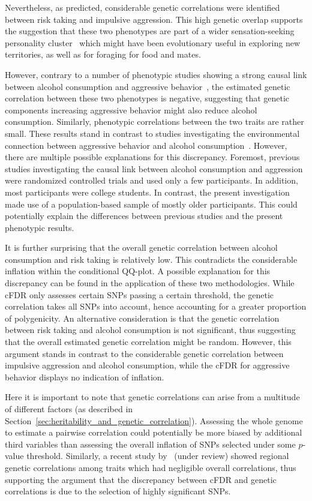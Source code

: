 Nevertheless, as predicted, considerable genetic correlations were identified between risk taking and impulsive aggression.
This high genetic overlap supports the suggestion that these two phenotypes are part of a wider sensation-seeking personality cluster~\cite{Zuckerman2000} which might have been evolutionary useful in exploring new territories, as well as for foraging for food and mates.

However, contrary to a number of phenotypic studies showing a strong causal link between alcohol consumption and aggressive behavior~\cite{FRANZKOWIAX1987,Zuckerman2000,Dakwar2011}, the estimated genetic correlation between these two phenotypes is negative, suggesting that genetic components increasing aggressive behavior might also reduce alcohol consumption.
Similarly, phenotypic correlations between the two traits are rather small.
These results stand in contrast to studies investigating the environmental connection between aggressive behavior and alcohol consumption~\cite{Bushman1990}.
However, there are multiple possible explanations for this discrepancy.
Foremost, previous studies investigating the causal link between alcohol consumption and aggression were randomized controlled trials and used only a few participants.
In addition, most participants were college students.
In contrast, the present investigation made use of a population-based sample of mostly older participants.
This could potentially explain the differences between previous studies and the  present phenotypic results.

It is further surprising that the overall genetic correlation between alcohol consumption and risk taking is relatively low.
This contradicts the considerable inflation within the conditional QQ-plot.
A possible explanation for this discrepancy can be found in the application of these two methodologies.
While cFDR only assesses certain SNPs passing a certain threshold, the genetic correlation takes all SNPs into account, hence accounting for a greater proportion of polygenicity.
An alternative consideration is that the genetic correlation between risk taking and alcohol consumption is not significant, thus suggesting that the overall estimated genetic correlation might be random.
However, this argument stands in contrast to the considerable genetic correlation between impulsive aggression and alcohol consumption, while the cFDR for aggressive behavior displays no indication of  inflation.

Here it is important to note that genetic correlations can arise from a multitude of different factors (as described in Section~\ref{sec:heritability_and_genetic_correlation}).
Assessing the whole genome to estimate a pairwise correlation could potentially be more biased by additional third variables than assessing the overall inflation of SNPs selected under some $p$-value threshold.
Similarly, a recent study by~\citet{Shi2016a} (under review) showed regional genetic correlations among traits which had negligible overall correlations,
thus supporting the argument that the discrepancy between cFDR and genetic correlations is due to the selection of highly significant SNPs.

